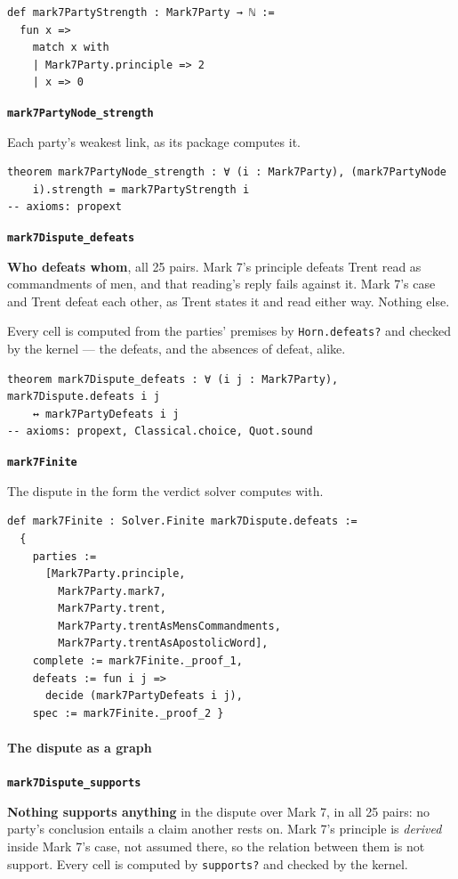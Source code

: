 \documentclass[11pt]{article}
\begin{document}
{\small\begin{verbatim}
def mark7PartyStrength : Mark7Party → ℕ :=
  fun x =>
    match x with
    | Mark7Party.principle => 2
    | x => 0
\end{verbatim}}
\par\medskip\noindent\textbf{\texttt{mark7\allowbreak{}Party\allowbreak{}Node\_\allowbreak{}strength}}\par\nobreak\noindent
Each party's weakest link, as its package computes it.

{\small\begin{verbatim}
theorem mark7PartyNode_strength : ∀ (i : Mark7Party), (mark7PartyNode
    i).strength = mark7PartyStrength i
-- axioms: propext
\end{verbatim}}
\par\medskip\noindent\textbf{\texttt{mark7\allowbreak{}Dispute\_\allowbreak{}defeats}}\par\nobreak\noindent
\textbf{Who defeats whom}, all 25 pairs. Mark 7's principle defeats Trent read as commandments of men, and that reading's reply fails against it. Mark 7's case and Trent defeat each other, as Trent states it and read either way. Nothing else.

Every cell is computed from the parties' premises by \texttt{Horn.defeats?} and checked by the kernel — the defeats, and the absences of defeat, alike.

{\small\begin{verbatim}
theorem mark7Dispute_defeats : ∀ (i j : Mark7Party), mark7Dispute.defeats i j
    ↔ mark7PartyDefeats i j
-- axioms: propext, Classical.choice, Quot.sound
\end{verbatim}}
\par\medskip\noindent\textbf{\texttt{mark7\allowbreak{}Finite}}\par\nobreak\noindent
The dispute in the form the verdict solver computes with.

{\small\begin{verbatim}
def mark7Finite : Solver.Finite mark7Dispute.defeats :=
  {
    parties :=
      [Mark7Party.principle,
        Mark7Party.mark7,
        Mark7Party.trent,
        Mark7Party.trentAsMensCommandments,
        Mark7Party.trentAsApostolicWord],
    complete := mark7Finite._proof_1,
    defeats := fun i j =>
      decide (mark7PartyDefeats i j),
    spec := mark7Finite._proof_2 }
\end{verbatim}}
\paragraph*{The dispute as a graph}
\leavevmode\par
\par\medskip\noindent\textbf{\texttt{mark7\allowbreak{}Dispute\_\allowbreak{}supports}}\par\nobreak\noindent
\textbf{Nothing supports anything} in the dispute over Mark 7, in all 25 pairs: no party's conclusion entails a claim another rests on. Mark 7's principle is \emph{derived} inside Mark 7's case, not assumed there, so the relation between them is not support. Every cell is computed by \texttt{supports?} and checked by the kernel.
\end{document}
